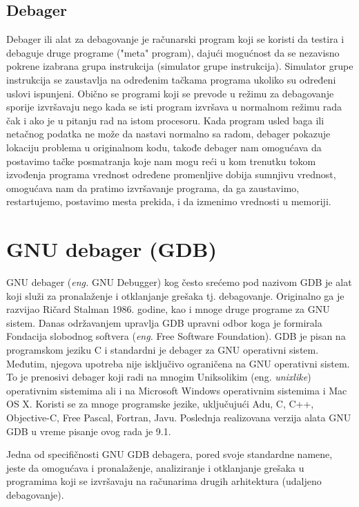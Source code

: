 \documentclass[a4paper]{article}
\begin{document}
\subsection{Debager}
\label{subsec:debager}
Debager ili alat za debagovanje je računarski program koji se koristi da testira i 
debaguje druge programe ("meta" program), dajući mogućnost da se nezavisno 
pokrene izabrana grupa instrukcija (simulator grupe instrukcija). Simulator grupe instrukcija se zaustavlja
na određenim tačkama programa ukoliko su određeni uslovi ispunjeni.
Obično se programi koji se prevode u režimu za debagovanje
sporije izvršavaju nego kada se isti program izvršava u normalnom režimu rada čak i ako je 
u pitanju rad na istom procesoru. \cite{debugger} Kada program usled baga ili netačnog podatka ne može da 
nastavi normalno sa radom, debager pokazuje lokaciju problema u originalnom kodu, takođe
debager nam omogućava da postavimo tačke posmatranja koje nam
mogu reći u kom trenutku tokom izvođenja programa vrednost
određene promenljive dobija sumnjivu vrednost, omogućava nam da
pratimo izvršavanje programa, da ga zaustavimo, restartujemo,
postavimo mesta prekida, i da izmenimo vrednosti u memoriji. 

\section{GNU debager (GDB)}
\label{sec:GDB}
GNU debager (\textit{eng.} GNU Debugger) kog često srećemo pod nazivom GDB je alat koji služi za pronalaženje 
i otklanjanje grešaka tj. debagovanje. Originalno ga je razvijao Ričard Stalman 1986. godine, kao i mnoge druge programe za GNU sistem\cite{gdb}. Danas održavanjem upravlja GDB upravni odbor koga je formirala Fondacija 
slobodnog softvera (\textit{eng.} Free Software Foundation).
GDB je pisan na programskom jeziku C i standardni je debager za GNU operativni sistem. 
Međutim, njegova upotreba nije isključivo ograničena na GNU operativni sistem. To je prenosivi debager
koji radi na mnogim Uniksolikim (eng. \textit{unixlike}) operativnim sistemima ali i na Microsoft Windows operativnim 
sistemima i Mac OS X. Koristi se za mnoge programske jezike, uključujući
Adu, C, C++, Objective-C, Free Pascal, Fortran, Javu.
Poslednja realizovana verzija alata GNU GDB u vreme pisanje ovog rada je 9.1. \cite{sourceware}

Jedna od specifičnosti GNU GDB debagera, pored svoje standardne namene, jeste da omogućava i 
pronalaženje, analiziranje i otklanjanje grešaka u programima koji se izvršavaju na računarima drugih 
arhitektura (udaljeno debagovanje)\cite{master_rad}.
\end{document}
